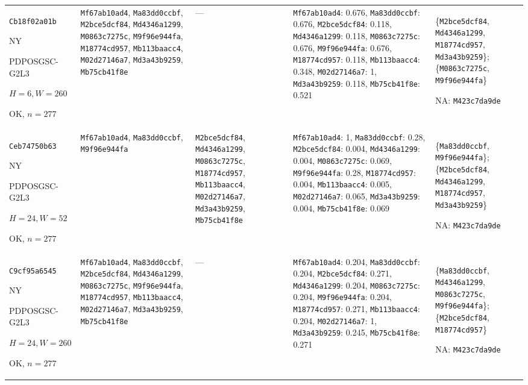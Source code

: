 \begin{longtable}{p{.15\linewidth}p{.17\linewidth}p{.17\linewidth}p{.25\linewidth}p{.14\linewidth}}
\texttt{Cb18f02a01b}\par NY\par PDPOSGSC-\allowbreak{}G2L3\par $H=6,W=260$\par OK, $n=277$ & \texttt{Mf67ab10ad4}, \texttt{Ma83dd0ccbf}, \texttt{M2bce5dcf84}, \texttt{Md4346a1299}, \texttt{M0863c7275c}, \texttt{M9f96e944fa}, \texttt{M18774cd957}, \texttt{Mb113baacc4}, \texttt{M02d27146a7}, \texttt{Md3a43b9259}, \texttt{Mb75cb41f8e} & --- & \texttt{Mf67ab10ad4}: 0.676, \texttt{Ma83dd0ccbf}: 0.676, \texttt{M2bce5dcf84}: 0.118, \texttt{Md4346a1299}: 0.118, \texttt{M0863c7275c}: 0.676, \texttt{M9f96e944fa}: 0.676, \texttt{M18774cd957}: 0.118, \texttt{Mb113baacc4}: 0.348, \texttt{M02d27146a7}: 1, \texttt{Md3a43b9259}: 0.118, \texttt{Mb75cb41f8e}: 0.521 & \{\texttt{M2bce5dcf84}, \texttt{Md4346a1299}, \texttt{M18774cd957}, \texttt{Md3a43b9259}\}; \{\texttt{M0863c7275c}, \texttt{M9f96e944fa}\}\par NA: \texttt{M423c7da9de} \\
\texttt{Ceb74750b63}\par NY\par PDPOSGSC-\allowbreak{}G2L3\par $H=24,W=52$\par OK, $n=277$ & \texttt{Mf67ab10ad4}, \texttt{Ma83dd0ccbf}, \texttt{M9f96e944fa} & \texttt{M2bce5dcf84}, \texttt{Md4346a1299}, \texttt{M0863c7275c}, \texttt{M18774cd957}, \texttt{Mb113baacc4}, \texttt{M02d27146a7}, \texttt{Md3a43b9259}, \texttt{Mb75cb41f8e} & \texttt{Mf67ab10ad4}: 1, \texttt{Ma83dd0ccbf}: 0.28, \texttt{M2bce5dcf84}: 0.004, \texttt{Md4346a1299}: 0.004, \texttt{M0863c7275c}: 0.069, \texttt{M9f96e944fa}: 0.28, \texttt{M18774cd957}: 0.004, \texttt{Mb113baacc4}: 0.005, \texttt{M02d27146a7}: 0.065, \texttt{Md3a43b9259}: 0.004, \texttt{Mb75cb41f8e}: 0.069 & \{\texttt{Ma83dd0ccbf}, \texttt{M9f96e944fa}\}; \{\texttt{M2bce5dcf84}, \texttt{Md4346a1299}, \texttt{M18774cd957}, \texttt{Md3a43b9259}\}\par NA: \texttt{M423c7da9de} \\
\texttt{C9cf95a6545}\par NY\par PDPOSGSC-\allowbreak{}G2L3\par $H=24,W=260$\par OK, $n=277$ & \texttt{Mf67ab10ad4}, \texttt{Ma83dd0ccbf}, \texttt{M2bce5dcf84}, \texttt{Md4346a1299}, \texttt{M0863c7275c}, \texttt{M9f96e944fa}, \texttt{M18774cd957}, \texttt{Mb113baacc4}, \texttt{M02d27146a7}, \texttt{Md3a43b9259}, \texttt{Mb75cb41f8e} & --- & \texttt{Mf67ab10ad4}: 0.204, \texttt{Ma83dd0ccbf}: 0.204, \texttt{M2bce5dcf84}: 0.271, \texttt{Md4346a1299}: 0.204, \texttt{M0863c7275c}: 0.204, \texttt{M9f96e944fa}: 0.204, \texttt{M18774cd957}: 0.271, \texttt{Mb113baacc4}: 0.204, \texttt{M02d27146a7}: 1, \texttt{Md3a43b9259}: 0.245, \texttt{Mb75cb41f8e}: 0.271 & \{\texttt{Ma83dd0ccbf}, \texttt{Md4346a1299}, \texttt{M0863c7275c}, \texttt{M9f96e944fa}\}; \{\texttt{M2bce5dcf84}, \texttt{M18774cd957}\}\par NA: \texttt{M423c7da9de} \\

\end{longtable}
